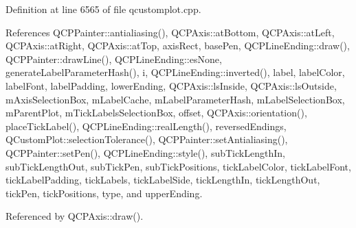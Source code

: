 Definition at line 6565 of file qcustomplot.\+cpp.



References Q\+C\+P\+Painter\+::antialiasing(), Q\+C\+P\+Axis\+::at\+Bottom, Q\+C\+P\+Axis\+::at\+Left, Q\+C\+P\+Axis\+::at\+Right, Q\+C\+P\+Axis\+::at\+Top, axis\+Rect, base\+Pen, Q\+C\+P\+Line\+Ending\+::draw(), Q\+C\+P\+Painter\+::draw\+Line(), Q\+C\+P\+Line\+Ending\+::es\+None, generate\+Label\+Parameter\+Hash(), i, Q\+C\+P\+Line\+Ending\+::inverted(), label, label\+Color, label\+Font, label\+Padding, lower\+Ending, Q\+C\+P\+Axis\+::ls\+Inside, Q\+C\+P\+Axis\+::ls\+Outside, m\+Axis\+Selection\+Box, m\+Label\+Cache, m\+Label\+Parameter\+Hash, m\+Label\+Selection\+Box, m\+Parent\+Plot, m\+Tick\+Labels\+Selection\+Box, offset, Q\+C\+P\+Axis\+::orientation(), place\+Tick\+Label(), Q\+C\+P\+Line\+Ending\+::real\+Length(), reversed\+Endings, Q\+Custom\+Plot\+::selection\+Tolerance(), Q\+C\+P\+Painter\+::set\+Antialiasing(), Q\+C\+P\+Painter\+::set\+Pen(), Q\+C\+P\+Line\+Ending\+::style(), sub\+Tick\+Length\+In, sub\+Tick\+Length\+Out, sub\+Tick\+Pen, sub\+Tick\+Positions, tick\+Label\+Color, tick\+Label\+Font, tick\+Label\+Padding, tick\+Labels, tick\+Label\+Side, tick\+Length\+In, tick\+Length\+Out, tick\+Pen, tick\+Positions, type, and upper\+Ending.



Referenced by Q\+C\+P\+Axis\+::draw().



